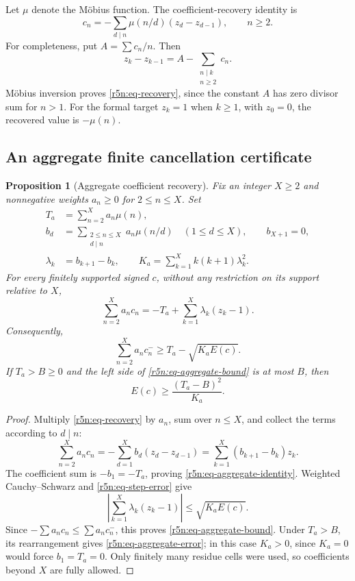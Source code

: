 \documentclass[11pt,a4paper]{article}
\newtheorem{proposition}[theorem]{Proposition}
\theoremstyle{definition}\newtheorem{definition}[theorem]{Definition}
\theoremstyle{remark}\newtheorem{remark}[theorem]{Remark}
\numberwithin{equation}{section}
\begin{document}
Let \(\mu\) denote the M\"obius function. The coefficient-recovery
identity \cite[Section~2]{Balazard} is
\begin{equation}
\label{r5n:eq-recovery}
 c_n=-\sum_{d\mid n}\mu(n/d)(z_d-z_{d-1}),
 \qquad n\ge2.
\end{equation}
For completeness, put \(A=\sum c_n/n\). Then
\[
 z_k-z_{k-1}
 =A-\sum_{\substack{n\mid k\\n\ge2}}c_n.
\]
M\"obius inversion proves \eqref{r5n:eq-recovery}, since the
constant \(A\) has zero divisor sum for \(n>1\).
For the formal target \(z_k=1\) when \(k\ge1\), with \(z_0=0\),
the recovered value is \(-\mu(n)\).

\subsection{An aggregate finite cancellation certificate}
\label{r5n:subsec-aggregate}

\begin{proposition}[Aggregate coefficient recovery]
\label{r5n:prop-aggregate}
Fix an integer \(X\ge2\) and nonnegative weights \(a_n\ge0\) for
\(2\le n\le X\). Set
\[
 \begin{aligned}
 T_a&=\sum_{n=2}^Xa_n\mu(n),\\
 b_d&=\sum_{\substack{2\le n\le X\\d\mid n}}a_n\mu(n/d)
            \quad(1\le d\le X),\qquad b_{X+1}=0,\\
 \lambda_k&=b_{k+1}-b_k,\qquad
 K_a=\sum_{k=1}^X k(k+1)\lambda_k^2.
 \end{aligned}
\]
For every finitely supported signed \(c\), without any restriction
on its support relative to \(X\),
\begin{equation}
\label{r5n:eq-aggregate-identity}
 \sum_{n=2}^Xa_nc_n
 =-T_a+\sum_{k=1}^X\lambda_k(z_k-1).
\end{equation}
Consequently,
\begin{equation}
\label{r5n:eq-aggregate-bound}
 \sum_{n=2}^Xa_nc_n^-\ge T_a-\sqrt{K_aE(c)}.
\end{equation}
If \(T_a>B\ge0\) and the left side of
\eqref{r5n:eq-aggregate-bound} is at most \(B\), then
\begin{equation}
\label{r5n:eq-aggregate-error}
 E(c)\ge\frac{(T_a-B)^2}{K_a}.
\end{equation}
\end{proposition}

\begin{proof}
Multiply \eqref{r5n:eq-recovery} by \(a_n\), sum over \(n\le X\),
and collect the terms according to \(d\mid n\):
\[
 \sum_{n=2}^Xa_nc_n
 =-\sum_{d=1}^Xb_d(z_d-z_{d-1})
 =\sum_{k=1}^X(b_{k+1}-b_k)z_k.
\]
The coefficient sum is \(-b_1=-T_a\), proving
\eqref{r5n:eq-aggregate-identity}. Weighted Cauchy--Schwarz and
\eqref{r5n:eq-step-error} give
\[
 \left|\sum_{k=1}^X\lambda_k(z_k-1)\right|
 \le\sqrt{K_aE(c)}.
\]
Since \(-\sum a_nc_n\le\sum a_nc_n^-\), this proves
\eqref{r5n:eq-aggregate-bound}.
Under \(T_a>B\), its rearrangement gives
\eqref{r5n:eq-aggregate-error}; in this case \(K_a>0\), since
\(K_a=0\) would force \(b_1=T_a=0\).
Only finitely many residue cells were used, so coefficients beyond
\(X\) are fully allowed.
\end{proof}
\end{document}
